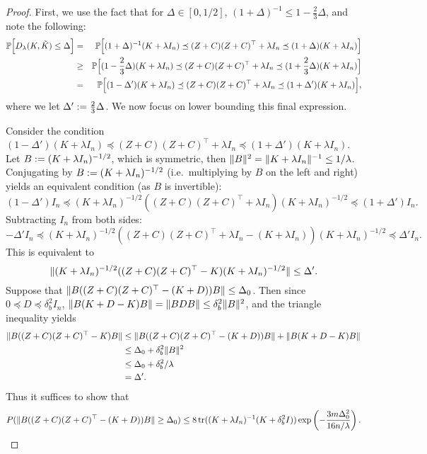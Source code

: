 \begin{proof}
First, we use the fact that for $\Delta\in[0,1/2]$, $(1+\Delta)^{-1} \leq 1-\frac{2}{3}\Delta$, and note the following:
\begin{eqnarray*}
\mathbb{P}\Big[D_{\lambda}(K,\tilde{K}) \leq \Delta\Big] &=& \mathbb{P}\Big[(1 + \Delta)^{-1}(K + \lambda I_n) \preceq (Z + C) (Z + C)^\top + \lambda I_n \preceq (1 + \Delta)(K + \lambda I_n)\Big] \\
&\geq& \mathbb{P}\Big[(1 - \frac{2}{3}\Delta)(K + \lambda I_n) \preceq (Z + C) (Z + C)^\top + \lambda I_n \preceq (1 + \frac{2}{3}\Delta)(K + \lambda I_n)\Big]\\
&=& \mathbb{P}\Big[(1 - \Delta')(K + \lambda I_n) \preceq (Z + C) (Z + C)^\top + \lambda I_n \preceq (1 + \Delta')(K + \lambda I_n)\Big],
\end{eqnarray*}
where we let $\Delta' := \frac{2}{3}\Delta$.  We now focus on lower bounding this final expression.

Consider the condition $(1 - \Delta')(K + \lambda I_n) \preceq (Z + C) (Z + C)^\top + \lambda I_n \preceq (1 +
\Delta')(K + \lambda I_n)$.
Let $B := (K + \lambda I_n)^{-1/2}$, which is symmetric, then $\|B\|^2 =
\|K + \lambda I_n\|^{-1} \leq 1/\lambda$.
Conjugating by $B := (K + \lambda I_n)^{-1/2}$ (i.e.\ multiplying by $B$ on the
left and right) yields an equivalent condition (as $B$ is
invertible):
\begin{equation*}
(1 - \Delta') I_n \preceq (K + \lambda I_n)^{-1/2} ((Z + C) (Z + C)^\top + \lambda I_n) (K + \lambda I_n)^{-1/2} \preceq (1 + \Delta') I_n.
\end{equation*}
Subtracting $I_n$ from both sides:
\begin{equation*}
-\Delta' I_n \preceq (K + \lambda I_n)^{-1/2} ((Z + C) (Z + C)^\top + \lambda I_n - (K + \lambda I_n)) (K + \lambda I_n)^{-1/2} \preceq \Delta' I_n.
\end{equation*}
This is equivalent to
\begin{equation*}
\|(K + \lambda I_n)^{-1/2} ((Z + C) (Z + C)^\top - K) (K + \lambda I_n)^{-1/2}\| \leq \Delta'.
\end{equation*}
Suppose that $\|B((Z + C)(Z + C)^\top - (K + D))B\| \leq \Delta_0$.
Then since $0 \preceq D \preceq \delta^2_b I_n$, $\|B(K + D - K) B\| = \|B D B\| \leq \delta^2_b
\|B\|^2$, and the triangle inequality yields
\begin{align*}
\|B((Z + C)(Z + C)^\top - K)B\|
&\leq \|B((Z + C)(Z + C)^\top - (K + D))B\| + \|B (K + D - K)B\| \\
&\leq \Delta_0 + \delta^2_b \|B\|^2 \\
&\leq \Delta_0 + \delta^2_b/\lambda \\
&= \Delta'.
\end{align*}
Thus it suffices to show that
\begin{equation*}
P(\|B((Z + C)(Z + C)^\top - (K + D))B\| \geq \Delta_0) \leq 8 \mathop{\rm tr}((K + \lambda I_n)^{-1} (K +
\delta^2_b I)) \exp \left( -\frac{3m \Delta_0^2}{16n/\lambda} \right).
\end{equation*}


\end{proof}
